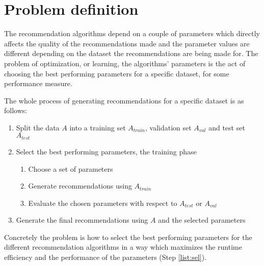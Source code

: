 
\newpage
\section{Problem definition}\label{sec:intro:prob}

The recommendation algorithms depend on a couple of parameters which directly affects the quality of the recommendations made and the parameter values are different depending on the dataset the recommendations are being made for. The problem of optimization, or learning, the algorithms' parameters is the act of choosing the best performing parameters for a specific dataset, for some performance measure.

The whole process of generating recommendations for a specific dataset is as follows:

\begin{enumerate}
    \item Split the data $A$ into a training set $A_{train}$, validation set $A_{val}$ and test set $A_{test}$
    \item \label{list:sel} Select the best performing parameters, the training phase
        \begin{enumerate}
            \item \label{list:choose} Choose a set of parameters
            \item Generate recommendations using $A_{train}$
            \item Evaluate the chosen parameters with respect to $A_{test}$ or $A_{val}$
        \end{enumerate}
    \item Generate the final recommendations using $A$ and the selected parameters
\end{enumerate}

Concretely the problem is how to select the best performing parameters for the different recommendation algorithms in a way which maximizes the runtime efficiency and the performance of the parameters (Step \ref{list:sel}).

